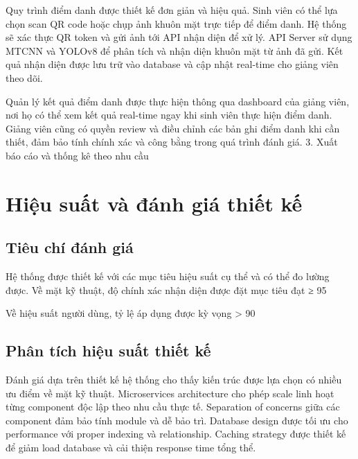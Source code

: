 \documentclass[12pt,a4paper]{report}
\begin{document}
Quy trình điểm danh được thiết kế đơn giản và hiệu quả. Sinh viên có thể lựa chọn scan QR code hoặc chụp ảnh khuôn mặt trực tiếp để điểm danh. Hệ thống sẽ xác thực QR token và gửi ảnh tới API nhận diện để xử lý. API Server sử dụng MTCNN và YOLOv8 để phân tích và nhận diện khuôn mặt từ ảnh đã gửi. Kết quả nhận diện được lưu trữ vào database và cập nhật real-time cho giảng viên theo dõi.

Quản lý kết quả điểm danh được thực hiện thông qua dashboard của giảng viên, nơi họ có thể xem kết quả real-time ngay khi sinh viên thực hiện điểm danh. Giảng viên cũng có quyền review và điều chỉnh các bản ghi điểm danh khi cần thiết, đảm bảo tính chính xác và công bằng trong quá trình đánh giá.
3. Xuất báo cáo và thống kê theo nhu cầu

\section{Hiệu suất và đánh giá thiết kế}
\subsection{Tiêu chí đánh giá}
Hệ thống được thiết kế với các mục tiêu hiệu suất cụ thể và có thể đo lường được. Về mặt kỹ thuật, độ chính xác nhận diện được đặt mục tiêu đạt ≥ 95%

Về hiệu suất người dùng, tỷ lệ áp dụng được kỳ vọng > 90%

\subsection{Phân tích hiệu suất thiết kế}
Đánh giá dựa trên thiết kế hệ thống cho thấy kiến trúc được lựa chọn có nhiều ưu điểm về mặt kỹ thuật. Microservices architecture cho phép scale linh hoạt từng component độc lập theo nhu cầu thực tế. Separation of concerns giữa các component đảm bảo tính module và dễ bảo trì. Database design được tối ưu cho performance với proper indexing và relationship. Caching strategy được thiết kế để giảm load database và cải thiện response time tổng thể.
\end{document}
